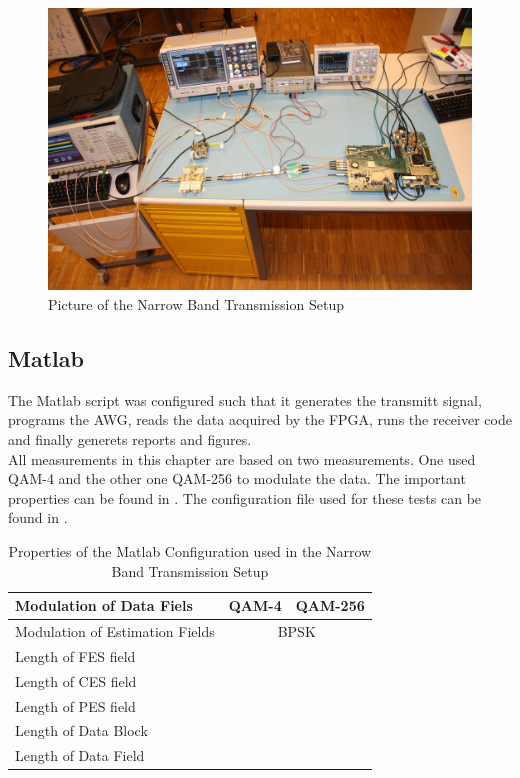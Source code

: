 \begin{figure}[p]
  \centering
  \includegraphics[width=\textwidth]{pictures/res_450_setup}
  \caption{Picture of the Narrow Band Transmission Setup}
  \label{fig:res_450_pic}
\end{figure}

\subsection{Matlab}
The Matlab script was configured such that it generates the transmitt signal,
programs the \gls{AWG}, reads the data acquired by the \gls{FPGA},
runs the receiver code and finally generets reports and figures. \\

All measurements in this chapter are based on two measurements.
One used \gls{QAM}-4 and the other one \gls{QAM}-256 to
modulate the data. The important properties can be found in
.
The configuration file used for these tests can be found in
. \\

\begin{table}[h]
  \centering
  \begin{tabular}{|l|l|l|}
    \hline
    Modulation of Data Fiels & \gls{QAM}-4 & \gls{QAM}-256 \\ \hline
    Modulation of Estimation Fields & \multicolumn{2}{c|}{\gls{BPSK}} \\ \hline
    Length of \gls{FES} field & & \\ \hline
    Length of \gls{CES} field & & \\ \hline
    Length of \gls{PES} field & & \\ \hline
    Length of Data Block & & \\ \hline
    Length of Data Field & & \\ \hline
  \end{tabular}
  \caption{Properties of the Matlab Configuration used in the
    Narrow Band Transmission Setup}
  \label{tab:res_450_cnf}
\end{table}

